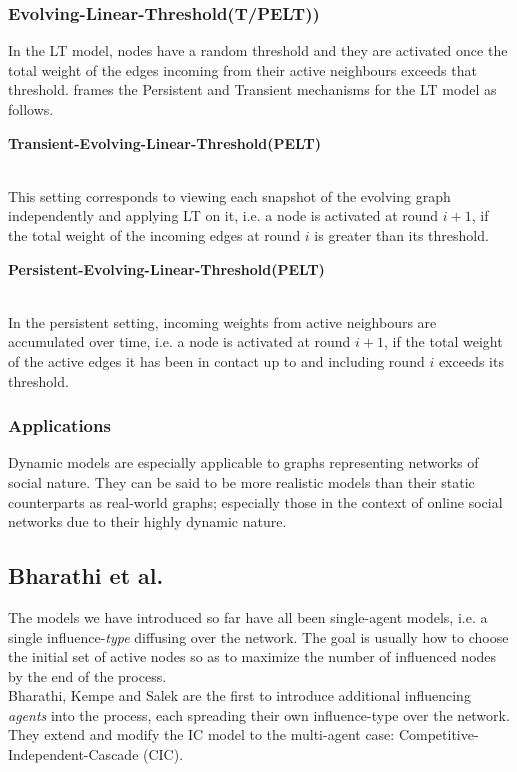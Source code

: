 \documentclass[twocolumn, 10pt]{article}
\begin{document}
\subsubsection{Evolving-Linear-Threshold(T/PELT))}
In the LT model, nodes have a random threshold and they are activated once the total weight of the edges incoming from their active neighbours exceeds that threshold. \cite{gay} frames the Persistent and Transient mechanisms for the LT model as follows.\\
\begin{minipage}{\textwidth}\textbf{Transient-Evolving-Linear-Threshold(PELT)}\end{minipage}\\
This setting corresponds to viewing each snapshot of the evolving graph independently and applying LT on it, i.e. a node is activated at round $i+1$, if the total weight of the incoming edges at round $i$ is greater than its threshold.\\
\begin{minipage}{\textwidth}\textbf{Persistent-Evolving-Linear-Threshold(PELT)} \end{minipage}\\
In the persistent setting, incoming weights from active neighbours are accumulated over time, i.e. a node is activated at round $i+1$, if the total weight of the active edges it has been in contact up to and including round $i$ exceeds its threshold.
\subsubsection{Applications}
Dynamic models are especially applicable to graphs representing networks of social nature. They can be said to be more realistic models than their static counterparts as real-world graphs; especially those in the context of online social networks due to their highly dynamic nature.
\subsection{Bharathi et al. \cite{bhar}}
The models we have introduced so far have all been single-agent models, i.e. a single influence-\textit{type} diffusing over the network. The goal is usually how to choose the initial set of active nodes so as to maximize the number of influenced nodes by the end of the process. \\
Bharathi, Kempe and Salek are the first to introduce additional influencing \textit{agents} into the process, each spreading their own influence-type over the network. They extend and modify the IC model to the multi-agent case: Competitive-Independent-Cascade (CIC).
\end{document}
